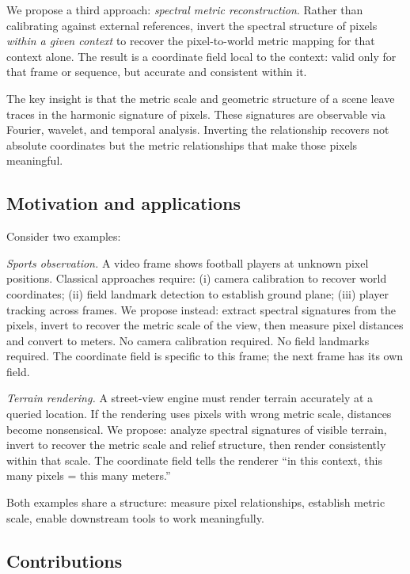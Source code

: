 \documentclass[11pt,twocolumn,a4paper]{article}
\theoremstyle{definition}
\begin{document}
We propose a third approach: \emph{spectral metric reconstruction}. Rather than calibrating against external references, invert the spectral structure of pixels \emph{within a given context} to recover the pixel-to-world metric mapping for that context alone. The result is a coordinate field local to the context: valid only for that frame or sequence, but accurate and consistent within it.

The key insight is that the metric scale and geometric structure of a scene leave traces in the harmonic signature of pixels. These signatures are observable via Fourier, wavelet, and temporal analysis. Inverting the relationship recovers not absolute coordinates but the metric relationships that make those pixels meaningful.

\subsection{Motivation and applications}

Consider two examples:

\emph{Sports observation.} A video frame shows football players at unknown pixel positions. Classical approaches require: (i) camera calibration to recover world coordinates; (ii) field landmark detection to establish ground plane; (iii) player tracking across frames. We propose instead: extract spectral signatures from the pixels, invert to recover the metric scale of the view, then measure pixel distances and convert to meters. No camera calibration required. No field landmarks required. The coordinate field is specific to this frame; the next frame has its own field.

\emph{Terrain rendering.} A street-view engine must render terrain accurately at a queried location. If the rendering uses pixels with wrong metric scale, distances become nonsensical. We propose: analyze spectral signatures of visible terrain, invert to recover the metric scale and relief structure, then render consistently within that scale. The coordinate field tells the renderer ``in this context, this many pixels = this many meters.''

Both examples share a structure: measure pixel relationships, establish metric scale, enable downstream tools to work meaningfully.

\subsection{Contributions}
\end{document}
